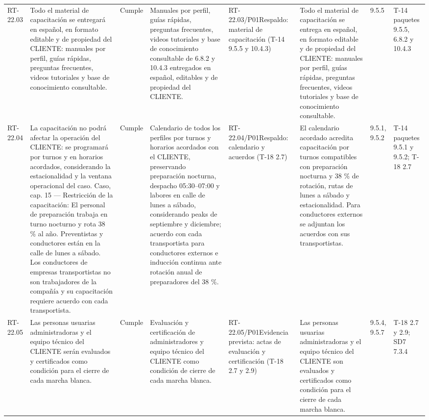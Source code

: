 \documentclass[oficio,firma,final]{lafrox}
\begin{document}
\begin{landscape}
{\begin{longtable}{@{}F{0.054} F{0.173} F{0.061} F{0.191} F{0.106} F{0.180} F{0.067} F{0.168}@{}}
  RT-22.03 & Todo el material de capacitación se entregará en español, en formato editable y de propiedad del CLIENTE: manuales por perfil, guías rápidas, preguntas frecuentes, videos tutoriales y base de conocimiento consultable. & Cumple & Manuales por perfil, guías rápidas, preguntas frecuentes, videos tutoriales y base de conocimiento consultable de 6.8.2 y 10.4.3 entregados en español, editables y de propiedad del CLIENTE. & RT-22.03/\allowbreak{}P01\newline Respaldo: material de capacitación (T-14 9.5.5 y 10.4.3) & Todo el material de capacitación se entrega en español, en formato editable y de propiedad del CLIENTE: manuales por perfil, guías rápidas, preguntas frecuentes, videos tutoriales y base de conocimiento consultable. & 9.5.5 & T-14 paquetes 9.5.5, 6.8.2 y 10.4.3  \\
  RT-22.04 & La capacitación no podrá afectar la operación del CLIENTE: se programará por turnos y en horarios acordados, considerando la estacionalidad y la ventana operacional del caso. Caso, cap. 15 — Restricción de la capacitación: El personal de preparación trabaja en turno nocturno y rota 38 \% al año. Preventistas y conductores están en la calle de lunes a sábado. Los conductores de empresas transportistas no son trabajadores de la compañía y su capacitación requiere acuerdo con cada transportista. & Cumple & Calendario de todos los perfiles por turnos y horarios acordados con el CLIENTE, preservando preparación nocturna, despacho 05:30–07:00 y labores en calle de lunes a sábado, considerando peaks de septiembre y diciembre; acuerdo con cada transportista para conductores externos e inducción continua ante rotación anual de preparadores del 38 \%. & RT-22.04/\allowbreak{}P01\newline Respaldo: calendario y acuerdos (T-18 2.7) & El calendario acordado acredita capacitación por turnos compatibles con preparación nocturna y 38 \% de rotación, rutas de lunes a sábado y estacionalidad. Para conductores externos se adjuntan los acuerdos con sus transportistas. & 9.5.1, 9.5.2 & T-14 paquetes 9.5.1 y 9.5.2; T-18 2.7  \\
  RT-22.05 & Las personas usuarias administradoras y el equipo técnico del CLIENTE serán evaluados y certificados como condición para el cierre de cada marcha blanca. & Cumple & Evaluación y certificación de administradores y equipo técnico del CLIENTE como condición de cierre de cada marcha blanca. & RT-22.05/\allowbreak{}P01\newline Evidencia prevista: actas de evaluación y certificación (T-18 2.7 y 2.9) & Las personas usuarias administradoras y el equipo técnico del CLIENTE son evaluados y certificados como condición para el cierre de cada marcha blanca. & 9.5.4, 9.5.7 & T-18 2.7 y 2.9; SD7 7.3.4  \\

\end{longtable}}
\end{landscape}
\end{document}
